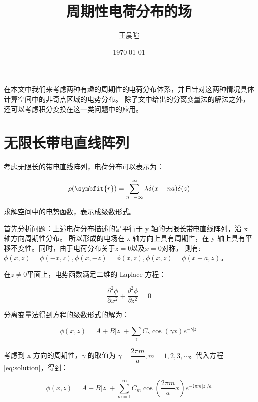 \documentclass[11pt,a4paper]{ctexart}
\title{周期性电荷分布的场}
\author{王晨暄}
\date{\today}
\begin{document}
\maketitle

在本文中我们来考虑两种有趣的周期性的电荷分布体系，并且针对这两种情况具体计算空间中的非奇点区域的电势分布。
除了文中给出的分离变量法的解法之外，还可以考虑积分变换在这一类问题中的应用。

\section{无限长带电直线阵列}

\begin{block}
    {\kaishu 考虑无限长的带电直线阵列，电荷分布可以表示为：

    \begin{equation}
        \rho(\symbfit{r})=\sum_{n=-\infty}^{\infty}\lambda\delta(x-na)\delta(z)
        \label{eq:charge_distribution1}
    \end{equation}

    求解空间中的电势函数，表示成级数形式。
    }

\end{block}

\bigskip

首先分析问题：上述电荷分布描述的是平行于 y 轴的无限长带电直线阵列，沿 x 轴方向周期性分布。
所以形成的电场在 x 轴方向上具有周期性，在 y 轴上具有平移不变性。同时，由于电荷分布关于$z=0$以及$x=0$对称，
则有: $\phi(x,z)=\phi(-x,z),\phi(x,-z)=\phi(x,z),\phi(x,z)=\phi(x+a,z)$。

\bigskip

在$z\neq 0$平面上，电势函数满足二维的 Laplace 方程：

\begin{equation}
    \frac{\partial^2\phi}{\partial x^2}+\frac{\partial^2\phi}{\partial z^2}=0
    \label{eq:Laplace}
\end{equation}

分离变量法得到方程的级数形式的解为：

\begin{equation}
    \phi(x,z)=A+B\left|z\right|+\sum_{\gamma}C_{\gamma}\cos(\gamma x)e^{-\gamma\left|z\right|}
    \label{eq:solution}
\end{equation}

考虑到 x 方向的周期性，$\gamma$ 的取值为 $\gamma=\dfrac{2\pi m}{a},m=1,2,3,\cdots$。代入方程\eqref{eq:solution}，得到：

\begin{equation}
    \phi(x,z)=A+B\left|z\right|+\sum_{m=1}^{\infty}C_{m}\cos\left(\frac{2\pi m}{a} x\right)e^{-2\pi m\left|z\right|/a}
\end{equation}
\end{document}
